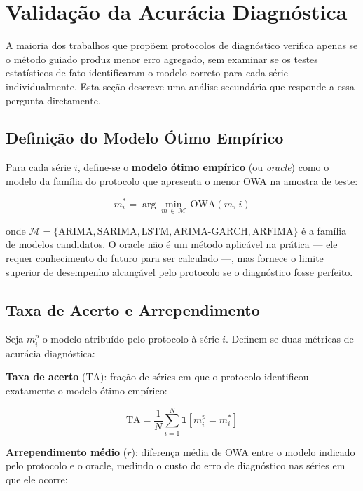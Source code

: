 \documentclass[
  12pt,
  openright,
  twoside,
  a4paper,
  english,
  brazil
]{abntex2}
\begin{document}
\section{Validação da Acurácia Diagnóstica}
\label{sec:validacao-protocolo}

A maioria dos trabalhos que propõem protocolos de diagnóstico verifica apenas se o método guiado produz menor erro agregado, sem examinar se os testes estatísticos de fato identificaram o modelo correto para cada série individualmente. Esta seção descreve uma análise secundária que responde a essa pergunta diretamente.

\subsection{Definição do Modelo Ótimo Empírico}
\label{subsec:oracle}

Para cada série $i$, define-se o \textbf{modelo ótimo empírico} (ou \textit{oracle}) como o modelo da família do protocolo que apresenta o menor OWA na amostra de teste:

\begin{equation}
  m^*_i = \arg\min_{m \,\in\, \mathcal{M}} \,\text{OWA}(m,\, i)
  \label{eq:oracle}
\end{equation}

onde $\mathcal{M} = \{\text{ARIMA}, \text{SARIMA}, \text{LSTM}, \text{ARIMA-GARCH}, \text{ARFIMA}\}$ é a família de modelos candidatos. O oracle não é um método aplicável na prática — ele requer conhecimento do futuro para ser calculado —, mas fornece o limite superior de desempenho alcançável pelo protocolo se o diagnóstico fosse perfeito.

\subsection{Taxa de Acerto e Arrependimento}
\label{subsec:taxa-acerto}

Seja $m^p_i$ o modelo atribuído pelo protocolo à série $i$. Definem-se duas métricas de acurácia diagnóstica:

\textbf{Taxa de acerto} ($\text{TA}$): fração de séries em que o protocolo identificou exatamente o modelo ótimo empírico:

\begin{equation}
  \text{TA} = \frac{1}{N} \sum_{i=1}^{N} \mathbf{1}\!\left[m^p_i = m^*_i\right]
  \label{eq:taxa-acerto}
\end{equation}

\textbf{Arrependimento médio} ($\bar{r}$): diferença média de OWA entre o modelo indicado pelo protocolo e o oracle, medindo o custo do erro de diagnóstico nas séries em que ele ocorre:
\end{document}
